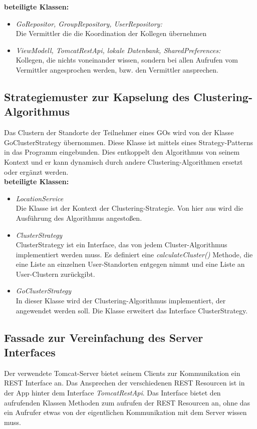 \documentclass[11pt,a4paper]{article}
\begin{document}
\textbf{beteiligte Klassen:}
\begin{itemize}
	\item \textit{GoRepositor, GroupRepository, UserRepository:}\\
	 Die Vermittler die die Koordination der Kollegen übernehmen
	\item \textit{ViewModell, TomcatRestApi, lokale Datenbank, SharedPreferences:}\\ Kollegen, die nichts voneinander wissen, sondern bei allen Aufrufen vom Vermittler angesprochen werden, bzw. den Vermittler ansprechen.
\end{itemize}

\subsection{Strategiemuster zur Kapselung des Clustering-Algorithmus}
Das Clustern der Standorte der Teilnehmer eines GOs wird von der Klasse GoClusterStrategy übernommen. Diese Klasse ist mittels eines Strategy-Patterns in das Programm eingebunden. Dies entkoppelt den Algorithmus von seinem Kontext und er kann dynamisch durch andere Clustering-Algorithmen ersetzt oder ergänzt werden. \\

\textbf{beteiligte Klassen:}
\begin{itemize}
	\item \textit{LocationService} \\
	Die Klasse ist der Kontext der Clustering-Strategie. Von hier aus wird die Ausführung des Algorithmus angestoßen.
	\item \textit{ClusterStrategy} \\
	ClusterStrategy ist ein Interface, das von jedem Cluster-Algorithmus implementiert werden muss. Es definiert eine \textit{calculateCluster()} Methode, die eine Liste an einzelnen User-Standorten entgegen nimmt und eine Liste an User-Clustern zurückgibt.
	\item \textit{GoClusterStrategy} \\
	In dieser Klasse wird der Clustering-Algorithmus implementiert, der angewendet werden soll. Die Klasse erweitert das Interface ClusterStrategy.
\end{itemize}

\subsection{Fassade zur Vereinfachung des Server Interfaces}
Der verwendete Tomcat-Server bietet seinem Clients zur Kommunikation ein REST Interface an. Das Ansprechen der verschiedenen REST Resourcen ist in der App hinter dem Interface \textit{TomcatRestApi}. Das Interface bietet den aufrufenden Klassen Methoden zum aufrufen der REST Resourcen an, ohne das ein Aufrufer etwas von der eigentlichen Kommunikation mit dem Server wissen muss. \\
\end{document}
